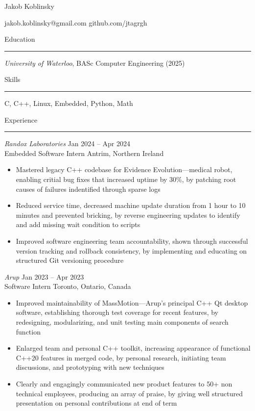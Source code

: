 \documentclass{article}
\newenvironment{mysection}[1]
{ {\large #1}

	\vspace{-1em}
	\rule{\linewidth}{0.4pt} 
} { \vspace{1em} }
\begin{document}

\begin{center}
{\Huge Jakob Koblinsky}

jakob.koblinsky@gmail.com \quad github.com/jtagrgh
\end{center}


\begin{mysection}{Education}
\textit{University of Waterloo}, BASc Computer Engineering (2025)
\end{mysection}

\begin{mysection}{Skills}
C, C++, Linux, Embedded, Python, Math
\end{mysection}

\begin{mysection}{Experience}
\textit{Randox Laboratories} \hfill Jan 2024 – Apr 2024 \\
Embedded Software Intern \hfill Antrim, Northern Ireland
\begin{itemize}[noitemsep,left=0pt,label={-}]
	\item 
	Mastered legacy C++ codebase for Evidence Evolution—medical robot,
	enabling critial bug fixes that increased uptime by 30\%, 
	by patching root causes of failures indentified through sparse logs
	\item
	Reduced service time, 
	decreased machine update duration from 1 hour to 10 minutes and prevented bricking, 
	by reverse engineering updates to identify and add missing wait condition to scripts
	\item
	Improved software engineering team accountability, 
	shown through successful version tracking and rollback consistency,
	by implementing and educating on structured Git versioning procedure
\end{itemize}
\vspace{1em}

\textit{Arup} \hfill Jan 2023 – Apr 2023 \\
Software Intern \hfill Toronto, Ontario, Canada
\begin{itemize}[noitemsep,left=0pt,label={-}]
	\item
	Improved maintainability of MassMotion—Arup’s principal C++ Qt desktop software,
	establishing thorough test coverage for recent features,
	by redesigning, modularizing, and unit testing main components of search function
	\item
	Enlarged team and personal C++ toolkit, 
	increasing appearance of functional C++20 features in merged code, 
	by personal research, initiating team discussions, and prototyping with new techniques
	\item
	Clearly and engagingly communicated new product features to 50+ non technical employees,
	producing an array of praise,
	by giving well structured presentation on personal contributions at end of term
\end{itemize}
\vspace{1em}


\end{mysection}
\end{document}
